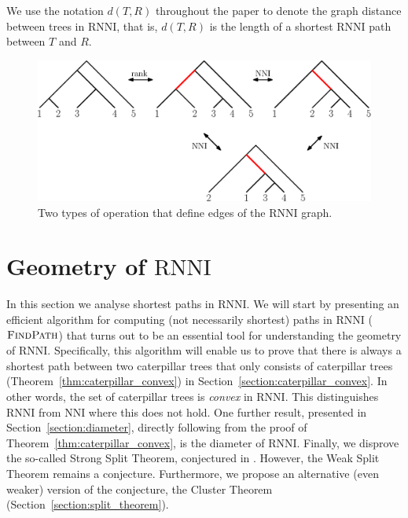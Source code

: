 \documentclass{amsart}
\newcommand{\nni}{\mathrm{NNI}}
\newcommand{\rnni}{\mathrm{RNNI}}
\newcommand{\findpath}{\textsc{FindPath}}
\begin{document}
We use the notation $d(T, R)$ throughout the paper to denote the graph distance between trees in $\rnni$, that is, $d(T, R)$ is the length of a shortest $\rnni$ path between $T$ and $R$.

\begin{figure}[H]
	\centering
	\includegraphics[width=\textwidth]{RNNI}
	\caption{Two types of operation that define edges of the $\rnni$ graph.}
	\label{fig:RNNI}
\end{figure}



\section{Geometry of $\rnni$}
\label{section:geometry}

In this section we analyse shortest paths in $\rnni$.
We will start by presenting an efficient algorithm for computing (not necessarily shortest) paths in $\rnni$ ($\findpath$) that turns out to be an essential tool for understanding the geometry of $\rnni$.
Specifically, this algorithm will enable us to prove that there is always a shortest path between two caterpillar trees that only consists of caterpillar trees (Theorem~\ref{thm:caterpillar_convex}) in Section~\ref{section:caterpillar_convex}.
In other words, the set of caterpillar trees is \emph{convex} in $\rnni$.
This distinguishes $\rnni$ from $\nni$ where this does not hold.
One further result, presented in Section~\ref{section:diameter}, directly following from the proof of Theorem~\ref{thm:caterpillar_convex}, is the diameter of $\rnni$.
Finally, we disprove the so-called Strong Split Theorem, conjectured in \autocite{Gavryushkin2018-ol}.
However, the Weak Split Theorem remains a conjecture.
Furthermore, we propose an alternative (even weaker) version of the conjecture, the Cluster Theorem (Section~\ref{section:split_theorem}).
\end{document}
